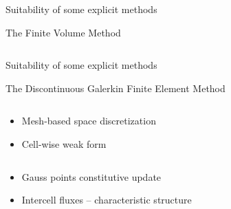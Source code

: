 \begin{frame}{Suitability of some explicit methods}
\begin{block}{The Finite Volume Method \cite{Leveque}}
\begin{overprint}
\begin{columns}
\begin{column}{0.48\textwidth}
        \end{column}
      \end{columns}
      \vspace{-0.2cm}
    \end{overprint}
  \end{block}
  
  
\end{frame}


\begin{frame}{Suitability of some explicit methods}
  \begin{block}{The Discontinuous Galerkin Finite Element Method \cite{Cockburn}}
    \vspace{-0.2cm}
    \begin{overprint}
      \vspace{-0.2cm}
      \begin{columns}
        \begin{footnotesize}
          \begin{column}{0.4\textwidth}
            \begin{itemize}
            \item[] Mesh-based space discretization
            \item[] Cell-wise weak form \cite{NeutronDG}
            \end{itemize}
          \end{column}
          \begin{column}{0.6\textwidth}
            \begin{itemize}
            \item[] Gauss points constitutive update
            \item[] Intercell fluxes -- characteristic structure
            \end{itemize}
          \end{column}
        \end{footnotesize}
      \end{columns}
      \vspace{3.65cm}
      \vspace{-0.2cm}

\end{overprint}
\end{block}
\end{frame}
